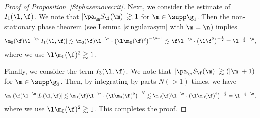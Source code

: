 \begin{proof}[Proof of Proposition~\ref{Stphasemovecrit}]
Next, we consider the estimate of $I_{1}(\l,\f)$. We note that $|\pa_{\m}S_{\f}(\m)|\gtrsim 1$ for $\m\in \supp \g_1$.
Then the non-stationary phase theorem (see Lemma \ref{singularasym} with $\m=\n$) implies
\begin{align*}
\m_0(\f)\l^{-\n}|I_1(\l,\f)|\lesssim \m_0(\f)\l^{-\n}\cdot \bigl(\l \m_0(\f)^2\bigr)^{-\n-1}\lesssim \f\l^{-\n}\cdot \bigl(\l \f^2\bigr)^{-\frac{1}{2}}=\l^{-\frac{1}{2}-\n},
\end{align*}
where we use $\l \m_0(\f)^2\gtrsim 1$.

Finally, we consider the term $I_{3}(\l,\f)$. We note that $|\pa_{\m}S_{\f}(\m)|\gtrsim (|\m|+1)$ for $\m\in \supp \g_3$. Then, by integrating by parts $N(>1)$ times, we have
\begin{align*}
\m_0(\f)\l^{-\n}|I_3(\l,\f)|\lesssim \m_0(\f)\l^{-\n}\cdot \bigl(\l \m_0(\f)^2\bigr)^{-N}\lesssim \m_0(\f)\l^{-\n}\cdot \bigl(\l \m_0(\f)^2\bigr)^{-\frac{1}{2}}=\l^{-\frac{1}{2}-\n},
\end{align*}
where we use $\l \m_0(\f)^2\gtrsim 1$. This completes the proof.
\end{proof}
